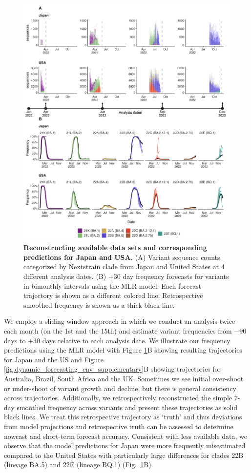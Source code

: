 \documentclass[11pt,oneside,letterpaper]{article}
\begin{document}
\begin{figure}[tb!]
	\centering
	\includegraphics[width=0.95\textwidth=0.01]{figures/dynamic_est_env.png}
	\caption{
		\textbf{Reconstructing available data sets and corresponding predictions for Japan and USA.}
		(A) Variant sequence counts categorized by Nextstrain clade from Japan and United States at 4 different analysis dates.
		(B) +30 day frequency forecasts for variants in bimonthly intervals using the MLR model.
		Each forecast trajectory is shown as a different colored line.
		Retrospective smoothed frequency is shown as a thick black line.
	}
	\label{fig:dynamic_forecast_env}
\end{figure}

We employ a sliding window approach in which we conduct an analysis twice each month (on the 1st and the 15th) and estimate variant frequencies from $-90$ days to $+30$ days relative to each analysis date.
We illustrate our frequency predictions using the MLR model with Figure \ref{fig:dynamic_forecast_env}B showing resulting trajectories for Japan and the US and Figure \ref{fig:dynamic_forecasting_env_supplementary}B showing trajectories for Australia, Brazil, South Africa and the UK.
Sometimes we see initial over-shoot or under-shoot of variant growth and decline, but there is general consistency across trajectories.
Additionally, we retrospectively reconstructed the simple 7-day smoothed frequency across variants and present these trajectories as solid black lines.
We treat this retrospective trajectory as `truth' and thus deviations from model projections and retrospective truth can be assessed to determine nowcast and short-term forecast accuracy.
Consistent with less available data, we observe that the model predictions for Japan were more frequently misestimated compared to the United States with particularly large differences for clades 22B (lineage BA.5) and 22E (lineage BQ.1) (Fig.~\ref{fig:dynamic_forecast_env}B).
\end{document}
